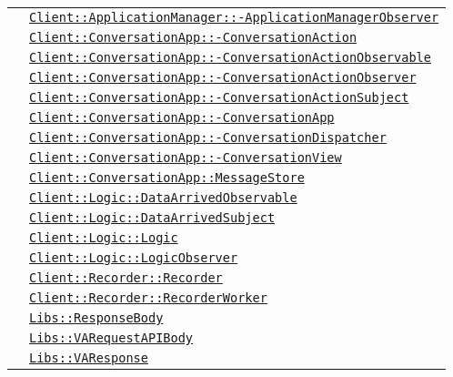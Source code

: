\begin{longtable}{|>{\centering}m{3cm}|m{10cm}<{\centering}|}
& \hyperref[Client::ApplicationManager::ApplicationManagerObserver]{\texttt{Client::ApplicationManager::-\linebreak ApplicationManagerObserver}}\\
& \hyperref[Client::ConversationApp::ConversationAction]{\texttt{Client::ConversationApp::-\linebreak ConversationAction}}\\
& \hyperref[Client::ConversationApp::ConversationActionObservable]{\texttt{Client::ConversationApp::-\linebreak ConversationActionObservable}}\\
& \hyperref[Client::ConversationApp::ConversationActionObserver]{\texttt{Client::ConversationApp::-\linebreak ConversationActionObserver}}\\
& \hyperref[Client::ConversationApp::ConversationActionSubject]{\texttt{Client::ConversationApp::-\linebreak ConversationActionSubject}}\\
& \hyperref[Client::ConversationApp::ConversationApp]{\texttt{Client::ConversationApp::-\linebreak ConversationApp}}\\
& \hyperref[Client::ConversationApp::ConversationDispatcher]{\texttt{Client::ConversationApp::-\linebreak ConversationDispatcher}}\\
& \hyperref[Client::ConversationApp::ConversationView]{\texttt{Client::ConversationApp::-\linebreak ConversationView}}\\
& \hyperref[Client::ConversationApp::MessageStore]{\texttt{Client::ConversationApp::MessageStore}}\\
& \hyperref[Client::Logic::DataArrivedObservable]{\texttt{Client::Logic::DataArrivedObservable}}\\
& \hyperref[Client::Logic::DataArrivedSubject]{\texttt{Client::Logic::DataArrivedSubject}}\\
& \hyperref[Client::Logic::Logic]{\texttt{Client::Logic::Logic}}\\
& \hyperref[Client::Logic::LogicObserver]{\texttt{Client::Logic::LogicObserver}}\\
& \hyperref[Client::Recorder::Recorder]{\texttt{Client::Recorder::Recorder}}\\
& \hyperref[Client::Recorder::RecorderWorker]{\texttt{Client::Recorder::RecorderWorker}}\\
& \hyperref[Libs::ResponseBody]{\texttt{Libs::ResponseBody}}\\
& \hyperref[Libs::VARequestAPIBody]{\texttt{Libs::VARequestAPIBody}}\\
& \hyperref[Libs::VAResponse]{\texttt{Libs::VAResponse}}\\ \hline


\end{longtable}
